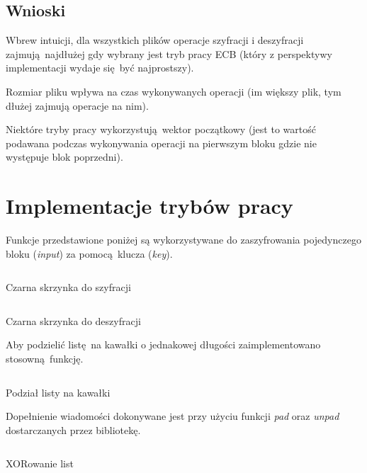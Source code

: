\documentclass[12pt]{article}
\newenvironment*{dummyenv}{}{}
\begin{document}
\begin{dummyenv}
	\inputminted[firstline=182,lastline=271]{yaml}{2-enc-dec-time.txt}
\end{dummyenv}

\subsection{Wnioski}

Wbrew intuicji, dla wszystkich plików operacje szyfracji i deszyfracji
zajmują najdłużej gdy wybrany jest tryb pracy ECB (który z perspektywy implementacji
wydaje się być najprostszy).

Rozmiar pliku wpływa na czas wykonywanych operacji (im większy plik, tym dłużej
zajmują operacje na nim).

Niektóre tryby pracy wykorzystują wektor początkowy (jest to wartość podawana
podczas wykonywania operacji na pierwszym bloku gdzie nie występuje blok poprzedni).

\newpage

\section{Implementacje trybów pracy}

Funkcje przedstawione poniżej są wykorzystywane do zaszyfrowania pojedynczego
bloku (\textit{input}) za pomocą klucza (\textit{key}).

\begin{listing}[H]
	\inputminted[firstline=9,lastline=13]{python}{../aes.py}
	\caption{Czarna skrzynka do szyfracji}
\end{listing}

\begin{listing}[H]
	\inputminted[firstline=15,lastline=19]{python}{../aes.py}
	\caption{Czarna skrzynka do deszyfracji}
\end{listing}

Aby podzielić listę na kawałki o jednakowej długości 
zaimplementowano stosowną funkcję.

\begin{listing}[H]
	\inputminted[firstline=21,lastline=24]{python}{../aes.py}
	\caption{Podział listy na kawałki}
\end{listing}

Dopełnienie wiadomości dokonywane jest przy użyciu funkcji
\textit{pad} oraz \textit{unpad} dostarczanych przez bibliotekę.

\begin{listing}[H]
	\inputminted[firstline=26,lastline=28]{python}{../aes.py}
	\caption{XORowanie list}
\end{listing}
\end{document}
